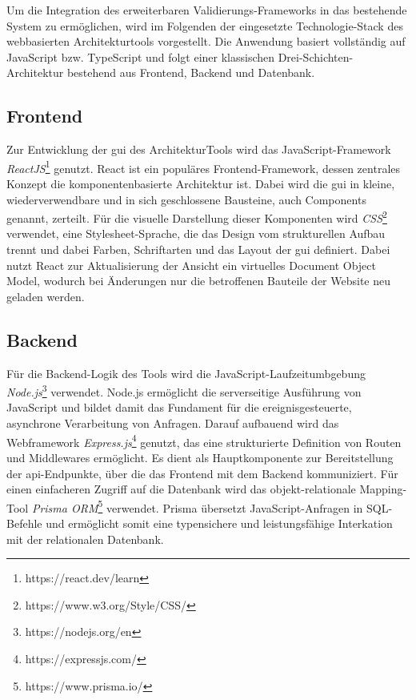 Um die Integration des erweiterbaren Validierungs-Frameworks in das bestehende System zu ermöglichen, wird im Folgenden der eingesetzte Technologie-Stack des webbasierten Architekturtools vorgestellt. Die Anwendung basiert vollständig auf JavaScript bzw. TypeScript und folgt einer klassischen Drei-Schichten-Architektur bestehend aus Frontend, Backend und Datenbank.

\subsection*{Frontend}

Zur Entwicklung der \gls{gui} des ArchitekturTools wird das JavaScript-Framework \textit{ReactJS}\footnote{https://react.dev/learn} genutzt. React ist ein populäres Frontend-Framework, dessen zentrales Konzept die komponentenbasierte Architektur ist. Dabei wird die \gls{gui} in kleine, wiederverwendbare und in sich geschlossene Bausteine, auch Components genannt, zerteilt. Für die visuelle Darstellung dieser Komponenten wird \textit{CSS}\footnote{https://www.w3.org/Style/CSS/} verwendet, eine Stylesheet-Sprache, die das Design vom strukturellen Aufbau trennt und dabei Farben, Schriftarten und das Layout der \gls{gui} definiert. Dabei nutzt React zur Aktualisierung der Ansicht ein virtuelles Document Object Model, wodurch bei Änderungen nur die betroffenen Bauteile der Website neu geladen werden.

\subsection*{Backend}

Für die Backend-Logik des Tools wird die JavaScript-Laufzeitumbgebung \textit{Node.js}\footnote{https://nodejs.org/en} verwendet. Node.js ermöglicht die serverseitige Ausführung von JavaScript und bildet damit das Fundament für die ereignisgesteuerte, asynchrone Verarbeitung von Anfragen. Darauf aufbauend wird das Webframework \textit{Express.js}\footnote{https://expressjs.com/} genutzt, das eine strukturierte Definition von Routen und Middlewares ermöglicht. Es dient als Hauptkomponente zur Bereitstellung der \gls{api}-Endpunkte, über die das Frontend mit dem Backend kommuniziert. Für einen einfacheren Zugriff auf die Datenbank wird das objekt-relationale Mapping-Tool \textit{Prisma ORM}\footnote{https://www.prisma.io/} verwendet. Prisma übersetzt JavaScript-Anfragen in SQL-Befehle und ermöglicht somit eine typensichere und leistungsfähige Interkation mit der relationalen Datenbank.


